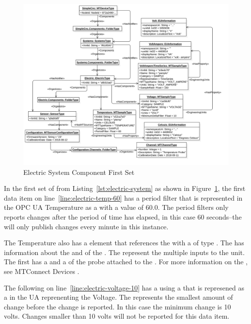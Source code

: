 \begin{figure}[ht]
  \centering
  \includegraphics[width=1.0\textwidth]{diagrams/mtconnect-mapping/electric-system.png}
  \caption{Electric System Component First Set}
  \label{fig:electric-system}
\end{figure}

In the first set of  from Listing~\ref{lst:electric-system} as shown in Figure~\ref{fig:electric-system}, the first data item on line~\ref{line:electric-temp-60} has a period filter that is represented in the OPC UA  Temperature as a   with a value of 60.0. The period filters only reports changes after the period of time has elapsed, in this case 60 seconds--the  will only publish changes every minute in this instance.

The Temperature  also has a  element that references the  with a  of type . The  has information about the  and  of the . The  represent the multiple inputs to the  unit. The first  has a  and a  of the probe attached to the . For more information on the , see MTConnect Devices \cite{MTCPart2}.

The following  on line~\ref{line:electric-voltage-10} has a  using a  that is represened as a  in the UA  reprenenting the  Voltage. The  represents the smallest amount of change before the change is reported. In this case the minimum change is 10 volts. Changes smaller than 10 volts will not be reported for this data item.

